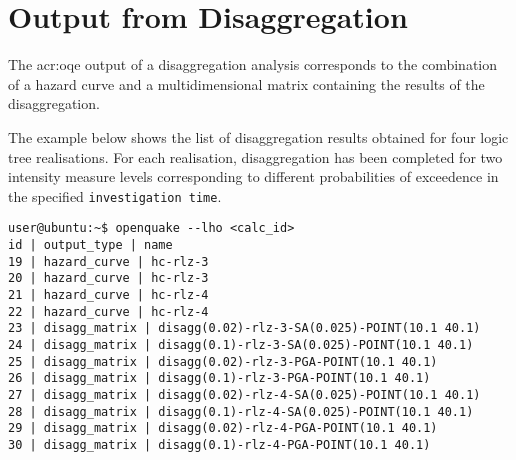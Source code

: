 \section{Output from Disaggregation}
The \gls{acr:oqe} output of a disaggregation analysis  
corresponds to the combination of a hazard curve and a multidimensional 
matrix containing the results of the disaggregation.

The example below shows the list of disaggregation results obtained 
for four logic tree realisations. 
%
For each realisation, disaggregation has been completed for two  
intensity measure levels corresponding to different probabilities of 
exceedence in the specified \texttt{investigation time}.
\begin{Verbatim}[frame=single, commandchars=\\\{\}]
user@ubuntu:~$ openquake --lho <calc_id> 
id | output_type | name
19 | hazard_curve | hc-rlz-3
20 | hazard_curve | hc-rlz-3
21 | hazard_curve | hc-rlz-4
22 | hazard_curve | hc-rlz-4
23 | disagg_matrix | disagg(0.02)-rlz-3-SA(0.025)-POINT(10.1 40.1)
24 | disagg_matrix | disagg(0.1)-rlz-3-SA(0.025)-POINT(10.1 40.1)
25 | disagg_matrix | disagg(0.02)-rlz-3-PGA-POINT(10.1 40.1)
26 | disagg_matrix | disagg(0.1)-rlz-3-PGA-POINT(10.1 40.1)
27 | disagg_matrix | disagg(0.02)-rlz-4-SA(0.025)-POINT(10.1 40.1)
28 | disagg_matrix | disagg(0.1)-rlz-4-SA(0.025)-POINT(10.1 40.1)
29 | disagg_matrix | disagg(0.02)-rlz-4-PGA-POINT(10.1 40.1)
30 | disagg_matrix | disagg(0.1)-rlz-4-PGA-POINT(10.1 40.1)
\end{Verbatim}

